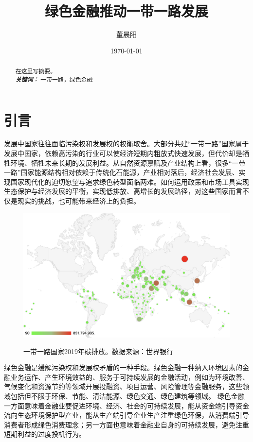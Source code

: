 \documentclass[a4paper,12pt]{ctexart}
\title{绿色金融推动一带一路发展}
\author{董晨阳}
\date{\today}
\providecommand{\keywords}[1]{\\\textbf{\textit{关键词：}} #1}
\begin{document}
\maketitle
\begin{abstract}
在这里写摘要。
\keywords{一带一路，绿色金融}
\end{abstract}
\clearpage
\section*{引言}

发展中国家往往面临污染权和发展权的权衡取舍\cite{曾文革2012从碳排放权之争看我国在气候变化上的法律应对}。大部分共建“一带一路”国家属于发展中国家，依赖高污染的行业可以使经济短期内粗放式快速发展，但代价却是牺牲环境、牺牲未来长期的发展利益。从自然资源禀赋及产业结构上看，很多“一带一路”国家能源结构相对依赖于传统化石能源，产业相对落后，经济社会发展、实现国家现代化的迫切愿望与追求绿色转型面临两难。如何运用政策和市场工具实现生态保护与经济发展的平衡，实现低排放、高增长的发展路径，对这些国家而言不仅是现实的挑战，也可能带来经济上的负担。
\begin{figure}[H]
    \centering
    \includegraphics[width=0.8\linewidth]{./img/碳排放.png}
    \label{fig:carbonemit}
    \caption{一带一路国家2019年碳排放。数据来源：世界银行}
\end{figure}

绿色金融是缓解污染权和发展权矛盾的一种手段。绿色金融一种纳入环境因素的金融业务运作、产生环境效益的、服务于可持续发展的金融活动，例如为环境改善、气候变化和资源节约等领域开展投融资、项目运营、风险管理等金融服务，这些领域包括但不限于环保、节能、清洁能源、绿色交通、绿色建筑等领域。
绿色金融一方面意味着金融业要促进环境、经济、社会的可持续发展，能从资金端引导资金流向生态环境保护型产业，能从生产端引导企业生产注重绿色环保，从消费端引导消费者形成绿色消费理念；另一方面也意味着金融业自身的可持续发展，避免注重短期利益的过度投机行为。
\end{document}

